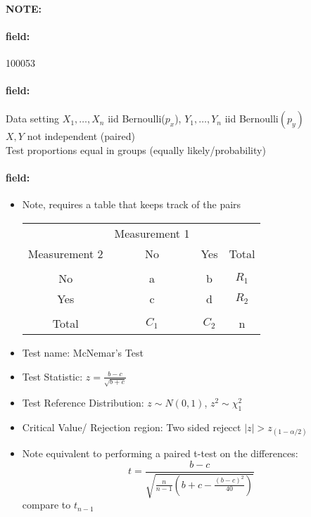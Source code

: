 \documentclass[12pt]{article}
\newenvironment{note}{\paragraph{NOTE:}}{}
\newenvironment{field}{\paragraph{field:}}{}
\begin{document}
\begin{note} \begin{field} \tiny 100053 \end{field}
 \begin{field}
  Data setting $X_1, \ldots , X_n$ iid Bernoulli($p_x$), $Y_1, \ldots, Y_n$ iid Bernoulli$(p_y)$\\ $X,Y$ not independent (paired) \\ Test proportions equal in groups (equally likely/probability)
 \end{field}
 \begin{field}
  \begin{itemize}

   \item Note, requires a table that keeps track of the pairs
         \begin{tabular}{|c|c c|c|}
                        & Measurement 1 &       &       \\
          Measurement 2 & No            & Yes   & Total \\
          \hline                                        \\
          No            & a             & b     & $R_1$ \\
          Yes           & c             & d     & $R_2$ \\
          \hline                                        \\
          Total         & $C_1$         & $C_2$ & n     \\
          \hline
         \end{tabular}
   \item Test name: McNemar's Test
   \item Test Statistic: $z = \frac{b-c}{\sqrt{b+c}}$
   \item Test Reference Distribution: $z \sim N(0,1)$, $z^2 \sim \chi_1^2$
   \item Critical Value/ Rejection region: Two sided rejecct $|z| > z_{(1 - \alpha/2)}$
   \item Note equivalent to performing a paired t-test on the differences:
         $$ t = \frac{b-c}{\sqrt{\frac{n}{n-1}(b + c - \frac{(b-c)^2}{40})}} $$ compare to $t_{n-1}$
  \end{itemize}
 \end{field}
\end{note}
\end{document}
